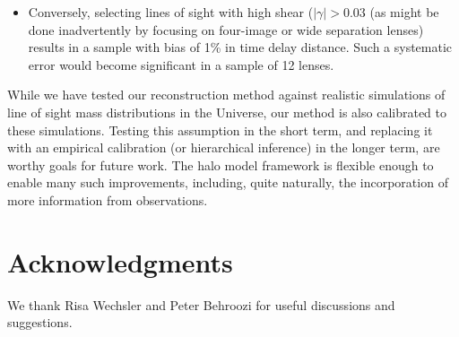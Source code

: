 \documentclass[useAMS,usenatbib]{mn2e}
\begin{document}
\begin{itemize}
\item Conversely, selecting lines of sight with high shear ($|\gamma| >
0.03$ (as might be done inadvertently by focusing on four-image or wide
separation lenses) results in a sample with bias of 1\% in time delay
distance. Such a systematic error would become significant in a sample of 12
lenses.


\end{itemize}



While we have tested our reconstruction method against realistic simulations
of line of sight mass distributions in the Universe, our method is also 
calibrated to these simulations. Testing this assumption in the short term,
and replacing it with an empirical calibration (or hierarchical inference) in
the longer term, are worthy goals for future work. The halo model framework is
flexible enough to enable many such improvements, including, quite naturally,
the incorporation of more information from observations. 



\section*{Acknowledgments}
 
We thank Risa Wechsler and Peter Behroozi 
for useful discussions and suggestions.

\end{document}
